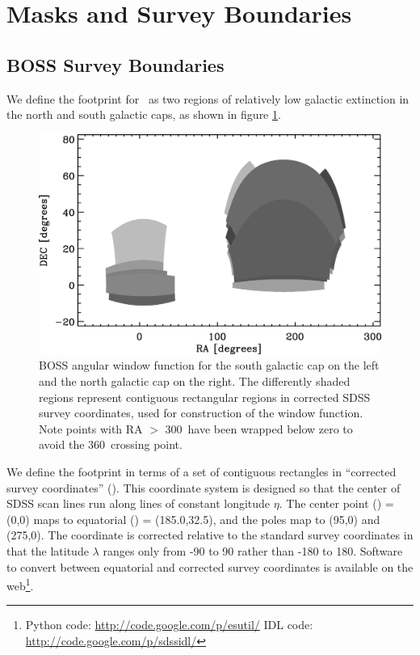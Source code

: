 \documentclass[12pt,preprint]{aastex}
\begin{document}
\section{Masks and Survey Boundaries} \label{sec:masks}

\subsection{BOSS Survey Boundaries}

We define the footprint for \boss\ as two regions of relatively low galactic
extinction in the north and south galactic caps, as shown in figure
\ref{fig:footprint}.  

\begin{figure}[t] \centering
 \centering 
 \includegraphics[scale=0.6]{fig/boss-poly-coverage.eps}

 \caption{BOSS angular window function for the south galactic cap on the left
 and the north galactic cap on the right.  The differently shaded regions
 represent contiguous rectangular regions in corrected SDSS survey coordinates,
 used for construction of the window function.  Note points with RA $>$
 300\arcdeg\ have been wrapped below zero to avoid the 360\arcdeg\ crossing
 point.} \label{fig:footprint}

\end{figure}

We define the footprint in terms of a set of contiguous rectangles in
``corrected survey coordinates'' (\etalambda).  This coordinate system is
designed so that the center of SDSS scan lines run along lines of constant
longitude $\eta$.  The center point (\etalambda) = (0,0) maps to equatorial
(\radec) = (185.0,32.5), and the poles map to (95,0) and (275,0).  The
coordinate is corrected relative to the standard survey coordinates \citep{edr}
in that the latitude $\lambda$ ranges only from -90 to 90 rather than -180 to
180.  Software to convert between equatorial and corrected survey coordinates
is available on the web\footnote{Python code:
\url{http://code.google.com/p/esutil/} IDL code:
\url{http://code.google.com/p/sdssidl/}}.
\end{document}
